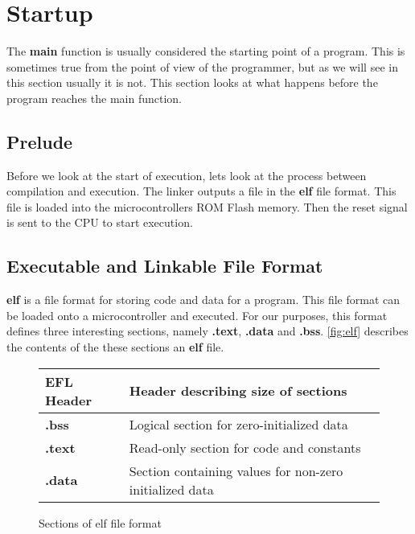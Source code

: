 \section{Startup}

The \textbf{main} function is usually considered the starting point of a program.
This is sometimes true from the point of view of the programmer, but as we will see in this section usually it is not.
This section looks at what happens before the program reaches the main function.

\subsection{Prelude}

Before we look at the start of execution, lets look at the process between compilation and execution.
The linker outputs a file in the \textbf{elf} file format.
This file is loaded into the microcontrollers ROM Flash memory.
Then the reset signal is sent to the CPU to start execution.

\subsection{Executable and Linkable File Format}
\textbf{elf} is a file format for storing code and data for a program.
This file format can be loaded onto a microcontroller and executed.
For our purposes, this format defines three interesting sections, namely \textbf{.text}, \textbf{.data} and \textbf{.bss}.
\autoref{fig:elf} describes the contents of the these sections an \textbf{elf} file.

\begin{figure}[H]
  \centering
  \begin{tabular}{|l|l|}
    \hline
    EFL Header & Header describing size of sections \\
    \hline
    \textbf{.bss} & Logical section for zero-initialized data \\
    \hline
    \textbf{.text} & Read-only section for code and constants \\
    \hline
    \textbf{.data} & Section containing values for non-zero initialized data \\
    \hline
  \end{tabular}
  \caption{Sections of elf file format}
  \label{fig:elf}
\end{figure}

